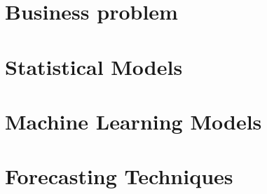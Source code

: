 



\section{Business problem} \label{sec:business_problem}



\section{Statistical Models} \label{sec:statistical_models}



\section{Machine Learning Models}
\label{sec:machine_learning_models}



\section{Forecasting Techniques}
\label{sec:forecasting_techniques}




